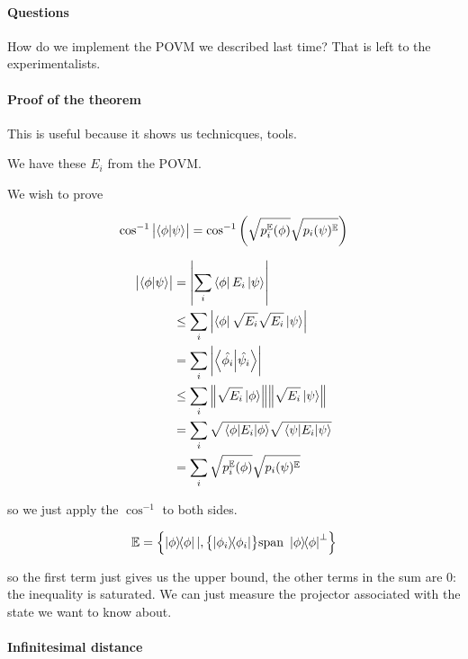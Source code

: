 \documentclass[main_zanardi.tex]{subfiles}
\begin{document}

\paragraph{Questions}

How do we implement the POVM we described last time? That is left to the experimentalists.

\paragraph{Proof of the theorem}

This is useful because it shows us technicques, tools.

We have these \( E _{i}  \) from the POVM.

We wish to prove

\begin{equation}
  \cos ^{-1} \abs{\braket{\phi}{\psi}}
  = \cos ^{-1} \qty(\sqrt{p_i ^{\mathbb{E}} (\phi)} \sqrt{p_i(\psi)^{\mathbb{E}}})
\end{equation}

\begin{align}
  \abs{\braket{\phi}{\psi}} &= \abs{\sum_i \bra{\phi} E_i \ket{\psi}}  \\
  &\leq \sum_i \abs{\bra{\phi} \sqrt{E _{i} } \sqrt{E _{i}} \ket{\psi}}  \\
  &= \sum _{i} \abs{\braket{\hat{\phi_i}}{\hat{\psi_i}}}  \\
  &\leq \sum_i \norm{\sqrt{E_i} \ket{\phi}}\norm{\sqrt{E_i} \ket{\psi}}  \\
  &= \sum_i \sqrt{\ev{E_i}{\phi}} \sqrt{\ev{E_i}{\psi}}  \\
  &= \sum_i \sqrt{p_i ^{\mathbb{E}} (\phi)} \sqrt{p_i(\psi)^{\mathbb{E}}}
\end{align}

so we just apply the \( \cos ^{-1} \) to both sides.

\begin{equation}
  \mathbb{E} = \qty{\ketbra{\phi} | , \qty{\ketbra{\phi_i}} \text{span } \ketbra{\phi}^{\perp}}
\end{equation}

so the first term just gives us the upper bound, the other terms in the sum are 0: the inequality is saturated. We can just measure the projector associated with the state we want to know about.

\paragraph{Infinitesimal distance}
\end{document}
